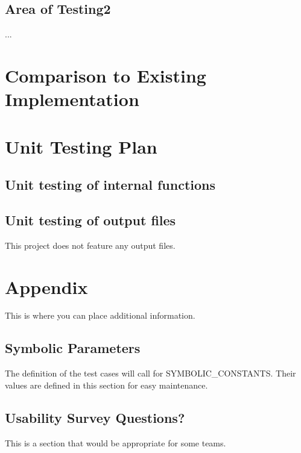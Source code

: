 \documentclass[12pt, titlepage]{article}
\begin{document}
\subsection{Area of Testing2}
...
	
\section{Comparison to Existing Implementation}	
				
\section{Unit Testing Plan}		
\subsection{Unit testing of internal functions}
\par 
\subsection{Unit testing of output files}		
\par This project does not feature any output files.


\newpage
\section{Appendix}
This is where you can place additional information.
\subsection{Symbolic Parameters}
The definition of the test cases will call for SYMBOLIC\_CONSTANTS.
Their values are defined in this section for easy maintenance.
\subsection{Usability Survey Questions?}
This is a section that would be appropriate for some teams.
\end{document}
